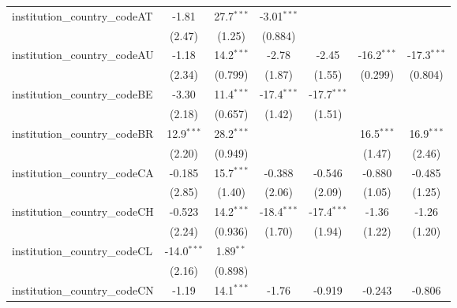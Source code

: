 \begin{tabular}{lcccccc}
   institution\_country\_codeAT          & -1.81         & 27.7$^{***}$  & -3.01$^{***}$ &               &               &   \\   
                                         & (2.47)        & (1.25)        & (0.884)       &               &               &   \\   
   institution\_country\_codeAU          & -1.18         & 14.2$^{***}$  & -2.78         & -2.45         & -16.2$^{***}$ & -17.3$^{***}$\\   
                                         & (2.34)        & (0.799)       & (1.87)        & (1.55)        & (0.299)       & (0.804)\\   
   institution\_country\_codeBE          & -3.30         & 11.4$^{***}$  & -17.4$^{***}$ & -17.7$^{***}$ &               &   \\   
                                         & (2.18)        & (0.657)       & (1.42)        & (1.51)        &               &   \\   
   institution\_country\_codeBR          & 12.9$^{***}$  & 28.2$^{***}$  &               &               & 16.5$^{***}$  & 16.9$^{***}$\\   
                                         & (2.20)        & (0.949)       &               &               & (1.47)        & (2.46)\\   
   institution\_country\_codeCA          & -0.185        & 15.7$^{***}$  & -0.388        & -0.546        & -0.880        & -0.485\\   
                                         & (2.85)        & (1.40)        & (2.06)        & (2.09)        & (1.05)        & (1.25)\\   
   institution\_country\_codeCH          & -0.523        & 14.2$^{***}$  & -18.4$^{***}$ & -17.4$^{***}$ & -1.36         & -1.26\\   
                                         & (2.24)        & (0.936)       & (1.70)        & (1.94)        & (1.22)        & (1.20)\\   
   institution\_country\_codeCL          & -14.0$^{***}$ & 1.89$^{**}$   &               &               &               &   \\   
                                         & (2.16)        & (0.898)       &               &               &               &   \\   
   institution\_country\_codeCN          & -1.19         & 14.1$^{***}$  & -1.76         & -0.919        & -0.243        & -0.806\\   

\end{tabular}
